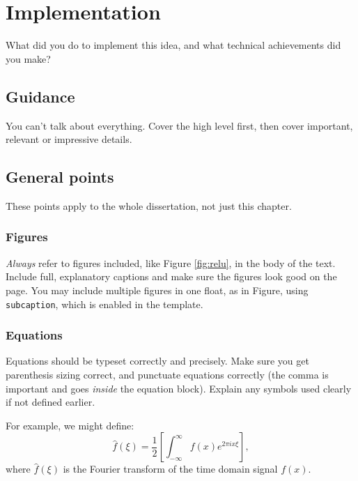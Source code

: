 \documentclass{l4proj}
\begin{document}

\chapter{Implementation}

What did you do to implement this idea, and what technical achievements did you make?

\section{Guidance}
You can't talk about everything. Cover the high level first, then cover important, relevant or impressive details.

\section{General points}

These points apply to the whole dissertation, not just this chapter.

\subsection{Figures}

\emph{Always} refer to figures included, like Figure \ref{fig:relu}, in the body of the text. Include full, explanatory captions and make sure the figures look good on the page.
You may include multiple figures in one float, as in Figure, using \texttt{subcaption}, which is enabled in the template.

\subsection{Equations}

Equations should be typeset correctly and precisely. Make sure you get parenthesis sizing correct, and punctuate equations correctly
(the comma is important and goes \textit{inside} the equation block). Explain any symbols used clearly if not defined earlier.

For example, we might define:
\begin{equation}
    \hat{f}(\xi) = \frac{1}{2}\left[ \int_{-\infty}^{\infty} f(x) e^{2\pi i x \xi} \right],
\end{equation}
where $\hat{f}(\xi)$ is the Fourier transform of the time domain signal $f(x)$.
\end{document}
